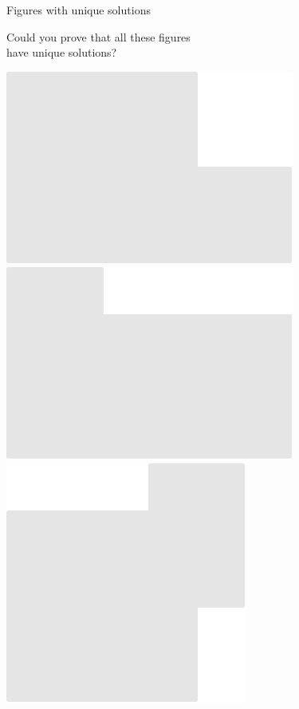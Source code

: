 \documentclass[14pt]{beamer}
\begin{document}

    \begin{frame}{Figures with unique solutions}

        \vspace{-1em}
        \begin{center}
            Could you prove that all these figures\\have unique solutions?

            \bigskip

            \includegraphics[scale=0.40]{figures/figure022e.pdf}\quad
            \includegraphics[scale=0.40]{figures/figure022z.pdf}\quad
            \includegraphics[scale=0.40]{figures/figure022f.pdf}\quad

\end{center}
\end{frame}
\end{document}
